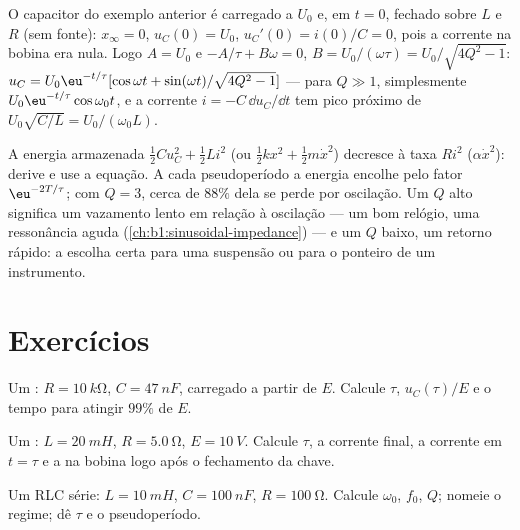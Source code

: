 \begin{example}\label{ex:b1:transient-regimes:ic}
O capacitor do exemplo anterior é carregado a $U_0$ e, em
$t = 0$, fechado sobre $L$ e $R$ (sem fonte): $x_\infty = 0$,
$u_C(0) = U_0$, $u_C'(0) = i(0)/C = 0$, pois a corrente na bobina era nula.
Logo $A = U_0$ e $-A/\tau + B\omega = 0$, $B = U_0/(\omega\tau) =
U_0/\sqrt{4Q^2 - 1}$: $u_C = U_0\eu^{-t/\tau}[\cos\omega t + \sin(\omega
t)/\sqrt{4Q^2 - 1}]$ --- para $Q \gg 1$, simplesmente $U_0\eu^{-t/\tau}\cos\omega_0 t$,
e a corrente $i = -C\,\dd u_C/\dd t$ tem pico próximo de $U_0\sqrt{C/L} =
U_0/(\omega_0 L)$.
\end{example}

\begin{remark}[Energia]\label{rem:b1:transient-regimes:energy}
A energia armazenada $\tfrac12 Cu_C^2 + \tfrac12 Li^2$ (ou $\tfrac12 kx^2
+ \tfrac12 m\dot x^2$) decresce à taxa $Ri^2$ ($\alpha\dot x^2$):
derive e use a equação. A cada pseudoperíodo a energia
encolhe pelo fator $\eu^{-2T/\tau}$; com $Q = 3$, cerca de $88\%$ dela
se perde por oscilação. Um $Q$ alto significa um vazamento lento em relação à
oscilação --- um bom relógio, uma ressonância aguda
(\cref{ch:b1:sinusoidal-impedance}) --- e um $Q$ baixo, um retorno rápido:
a escolha certa para uma suspensão ou para o ponteiro de um instrumento.
\end{remark}

\section{Exercícios}

\begin{exercise}[$\star$]\label{exo:b1:transient-regimes:1}
Um : $R = \qty{10}{k\ohm}$, $C = \qty{47}{nF}$, carregado a partir de
$E$. Calcule $\tau$, $u_C(\tau)/E$ e o tempo para atingir $99\%$ de $E$.
\end{exercise}

\begin{exercise}[$\star$]\label{exo:b1:transient-regimes:2}
Um : $L = \qty{20}{mH}$, $R = \qty{5.0}{\ohm}$, $E = \qty{10}{V}$.
Calcule $\tau$, a corrente final, a corrente em $t = \tau$ e a
 na bobina logo após o fechamento da chave.
\end{exercise}

\begin{exercise}[$\star$]\label{exo:b1:transient-regimes:3}
Um RLC série: $L = \qty{10}{mH}$, $C = \qty{100}{nF}$, $R = \qty{100}{\ohm}$.
Calcule $\omega_0$, $f_0$, $Q$; nomeie o regime; dê $\tau$ e o
pseudoperíodo.
\end{exercise}

